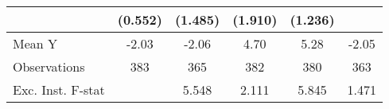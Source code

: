 {\begin{tabular}{l*{5}{c}}
            &     (0.552)         &     (1.485)         &     (1.910)         &     (1.236)         &                     \\
\midrule
Mean Y      &       -2.03         &       -2.06         &        4.70         &        5.28         &       -2.05         \\
Observations&         383         &         365         &         382         &         380         &         363         \\
Exc. Inst. F-stat&                     &       5.548         &       2.111         &       5.845         &       1.471         \\
\bottomrule
\end{tabular}
}
